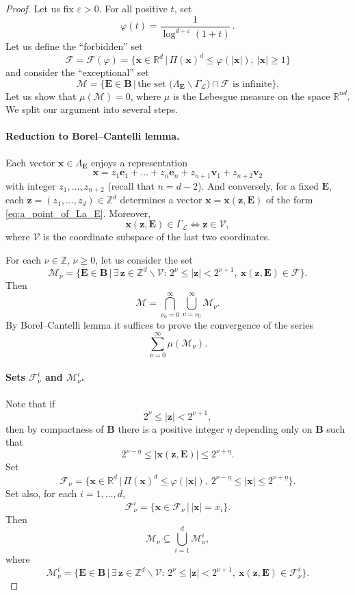 \documentclass[a4paper,12pt]{article}
\theoremstyle{definition}
\theoremstyle{remark}
\theoremstyle{plain}
\renewcommand{\vec}[1]{\mathbf{#1}}
\renewcommand{\geq}{\geqslant}
\renewcommand{\leq}{\leqslant}
\newcommand{\e}{\varepsilon}
\newcommand{\R}{\mathbb{R}}
\newcommand{\Z}{\mathbb{Z}}
\newcommand{\La}{\Lambda}
\newcommand{\Ga}{\Gamma}
\newcommand{\cF}{\mathcal{F}}
\newcommand{\cL}{\mathcal{L}}
\newcommand{\cM}{\mathcal{M}}
\newcommand{\cV}{\mathcal{V}}
\newcommand{\bB}{\mathbf{B}}
\newcommand{\bE}{\mathbf{E}}
\begin{document}
\begin{proof}
  Let us fix $\e>0$. For all positive $t$, set
  \[
    \varphi(t)=\frac1{\log^{d+\e}(1+t)}\,.
  \]
  Let us define the ``forbidden'' set
  \[
    \cF=\cF(\varphi)=\Big\{\vec x\in\R^d \,\Big|\, \Pi(\vec x)^d\leq\varphi(|\vec x|),\ |\vec x|\geq1 \Big\}
  \]
  and consider the ``exceptional'' set
  \[
    \cM=\Big\{\bE\in\bB \,\Big|\, \text{the set }\big(\La_\bE\backslash\Ga_\cL\big)\cap\cF\text{ is infinite} \Big\}.
  \]
  Let us show that $\mu(\cM)=0$, where $\mu$ is the Lebesgue measure on the space $\R^{nd}$. We split our argument into several steps.
  
  \paragraph{Reduction to Borel--Cantelli lemma.}
  
  Each vector $\vec x\in\La_\bE$ enjoys a representation
  \begin{equation}\label{eq:a_point_of_La_E}
    \vec x=z_1\vec e_1+\ldots+z_n\vec e_n+z_{n+1}\vec v_1+z_{n+2}\vec v_2
  \end{equation}
  with integer $z_1,\ldots,z_{n+2}$ (recall that $n=d-2$). And conversely, for a fixed $\bE$, each $\vec z=(z_1,\ldots,z_d)\in\Z^d$ determines a vector $\vec x=\vec x(\vec z,\bE)$ of the form \eqref{eq:a_point_of_La_E}. Moreover,
  \[
    \vec x(\vec z,\bE)\in\Ga_\cL
    \iff
    \vec z\in\cV,
  \]
  where $\cV$ is the coordinate subspace of the last two coordinates.

  For each $\nu\in\Z$, $\nu\geq0$, let us consider the set
  \[
    \cM_\nu=\Big\{\bE\in\bB \,\Big|\, \exists\,\vec z\in\Z^d\backslash\cV:\,2^\nu\leq|\vec z|<2^{\nu+1},\ \vec x(\vec z,\bE)\in\cF \Big\}.
  \]
  Then
  \[
    \cM=\bigcap_{\nu_0=0}^\infty\bigcup_{\nu=\nu_0}^\infty\cM_\nu.
  \]
  By Borel--Cantelli lemma it suffices to prove the convergence of the series
  \begin{equation}\label{eq:borel_cantelli_series}
    \sum_{\nu=0}^\infty\mu(\cM_\nu).
  \end{equation}
  
  \paragraph{Sets $\cF^i_\nu$ and $\cM^i_\nu$.}  
  
  Note that if
  \[
    2^\nu\leq|\vec z|<2^{\nu+1},
  \]
  then by compactness of $\bB$ there is a positive integer $\eta$ depending only on $\bB$ such that
  \[
    2^{\nu-\eta}\leq|\vec x(\vec z,\bE)|\leq2^{\nu+\eta}.
  \]
  Set
  \[
    \cF_\nu=\Big\{\vec x\in\R^d \,\Big|\, \Pi(\vec x)^d\leq\varphi(|\vec x|),\ 2^{\nu-\eta}\leq|\vec x|\leq2^{\nu+\eta} \Big\}.
  \]
  Set also, for each $i=1,\ldots,d$,
  \[
    \cF^i_\nu=\Big\{\vec x\in\cF_\nu \,\Big|\, |\vec x|=x_i \Big\}.
  \]
  Then
  \[
    \cM_\nu\subseteq\bigcup_{i=1}^d\cM^i_\nu,
  \]
  where
  \[
    \cM^i_\nu=\Big\{\bE\in\bB \,\Big|\, \exists\,\vec z\in\Z^d\backslash\cV:\,2^\nu\leq|\vec z|<2^{\nu+1},\ \vec x(\vec z,\bE)\in\cF^i_\nu \Big\}.
  \]
  

\end{proof}
\end{document}
